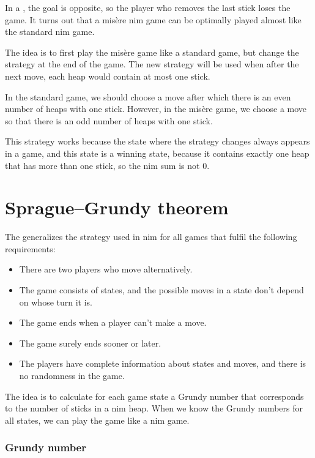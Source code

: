 
In a , the goal is opposite,
so the player who removes the last stick
loses the game.
It turns out that a misère nim game can be
optimally played almost like the standard nim game.

The idea is to first play the misère game
like a standard game, but change the strategy
at the end of the game.
The new strategy will be used when after the next move,
each heap would contain at most one stick.

In the standard game, we should choose a move
after which there is an even number of heaps with one stick.
However, in the misère game, we choose a move so that
there is an odd number of heaps with one stick.

This strategy works because the state where the
strategy changes always appears in a game,
and this state is a winning state, because
it contains exactly one heap that has more than one stick,
so the nim sum is not 0.

\section{Sprague–Grundy theorem}


The  generalizes the
strategy used in nim for all games that fulfil
the following requirements:

\begin{itemize}[noitemsep]
\item There are two players who move alternatively.
\item The game consists of states, and the possible moves
in a state don't depend on whose turn it is.
\item The game ends when a player can't make a move.
\item The game surely ends sooner or later.
\item The players have complete information about
states and moves, and there is no randomness in the game.
\end{itemize}
The idea is to calculate for each game state
a Grundy number that corresponds to the number of
sticks in a nim heap.
When we know the Grundy numbers for all states,
we can play the game like a nim game.

\subsubsection{Grundy number}

